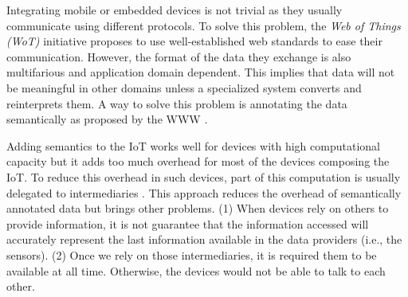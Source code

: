 
% 

Integrating mobile or embedded devices is not trivial as they usually communicate using different protocols.
To solve this problem, the \emph{Web of Things (WoT)} initiative proposes to use well-established web standards to ease their communication.
However, the format of the data they exchange is also multifarious and application domain dependent.
This implies that data will not be meaningful in other domains unless a specialized system converts and reinterprets them.
A way to solve this problem is annotating the data semantically as proposed by the WWW \citep{ChuaG10,kimKC11}.

Adding semantics to the IoT works well for devices with high computational capacity but it adds too much overhead for most of the devices composing the IoT.
To reduce this overhead in such devices, part of this computation is usually delegated to intermediaries \citep{honkola_smart-m3_2010}.
This approach reduces the overhead of semantically annotated data but brings other problems.
(1) When devices rely on others to provide information, it is not guarantee that the information accessed will accurately represent the last information available in the data providers (i.e., the sensors).
(2) Once we rely on those intermediaries, it is required them to be available at all time.
Otherwise, the devices would not be able to talk to each other.

